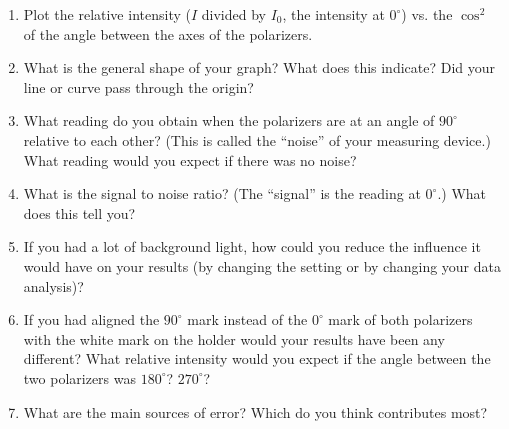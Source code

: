 \begin{enumerate}
\item Plot the relative intensity ($I$ divided by $I_0$, the intensity at $0^{\circ}$) vs. the $\cos^2$ of the angle between the axes of the polarizers.

\item What is the general shape of your graph? What does this indicate? Did your line or curve pass through the origin?

\item What reading do you obtain when the polarizers are at an angle of $90^{\circ}$ relative to each other? (This is called the ``noise'' of your measuring device.) What reading would you expect if there was no noise?

\item What is the signal to noise ratio? (The ``signal'' is the reading at $0^{\circ}$.) What does this tell you?

\item If you had a lot of background light, how could you reduce the influence it would have on your results (by changing the setting or by changing your data analysis)?

\item If you had aligned the $90^{\circ}$ mark instead of the $0^{\circ}$ mark of both polarizers with the white mark on the holder would your results have been any different? What relative intensity would you expect if the angle between the two polarizers was $180^{\circ}$? $270^{\circ}$?

\item What are the main sources of error? Which do you think contributes most?
\end{enumerate}

